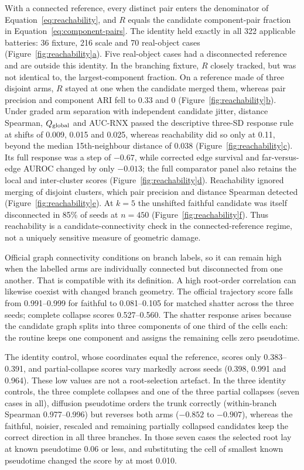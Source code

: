 \documentclass[11pt]{article}
\newcommand{\figpanel}[2]{Figure~\hyperref[#1]{\ref*{#1}#2}}
\begin{document}
With a connected reference, every distinct pair enters the denominator of Equation~\ref{eq:reachability}, and $R$ equals the candidate component-pair fraction in Equation~\ref{eq:component-pairs}. The identity held exactly in all 322 applicable batteries: 36 fixture, 216 scale and 70 real-object cases (\figpanel{fig:reachability}{a}). Five real-object cases had a disconnected reference and are outside this identity. In the branching fixture, $R$ closely tracked, but was not identical to, the largest-component fraction. On a reference made of three disjoint arms, $R$ stayed at one when the candidate merged them, whereas pair precision and component ARI fell to 0.33 and 0 (\figpanel{fig:reachability}{b}). Under graded arm separation with independent candidate jitter, distance Spearman, $Q_{\rm global}$ and AUC-RNX passed the descriptive three-SD response rule at shifts of 0.009, 0.015 and 0.025, whereas reachability did so only at 0.11, beyond the median 15th-neighbour distance of 0.038 (\figpanel{fig:reachability}{c}). Its full response was a step of $-0.67$, while corrected edge survival and far-versus-edge AUROC changed by only $-0.013$; the full comparator panel also retains the local and inter-cluster scores (\figpanel{fig:reachability}{d}). Reachability ignored merging of disjoint clusters, which pair precision and distance Spearman detected (\figpanel{fig:reachability}{e}). At $k=5$ the unshifted faithful candidate was itself disconnected in 85\% of seeds at $n=450$ (\figpanel{fig:reachability}{f}). Thus reachability is a candidate-connectivity check in the connected-reference regime, not a uniquely sensitive measure of geometric damage.


\FloatBarrier

Official graph connectivity conditions on branch labels, so it can remain high when the labelled arms are individually connected but disconnected from one another. That is compatible with its definition. A high root-order correlation can likewise coexist with changed branch geometry. The official trajectory score falls from 0.991--0.999 for faithful to 0.081--0.105 for matched shatter across the three seeds; complete collapse scores 0.527--0.560. The shatter response arises because the candidate graph splits into three components of one third of the cells each: the routine keeps one component and assigns the remaining cells zero pseudotime.

The identity control, whose coordinates equal the reference, scores only 0.383--0.391, and partial-collapse scores vary markedly across seeds (0.398, 0.991 and 0.964). These low values are not a root-selection artefact. In the three identity controls, the three complete collapses and one of the three partial collapses (seven cases in all), diffusion pseudotime orders the trunk correctly (within-branch Spearman 0.977--0.996) but reverses both arms ($-0.852$ to $-0.907$), whereas the faithful, noisier, rescaled and remaining partially collapsed candidates keep the correct direction in all three branches. In those seven cases the selected root lay at known pseudotime 0.06 or less, and substituting the cell of smallest known pseudotime changed the score by at most 0.010.
\end{document}
